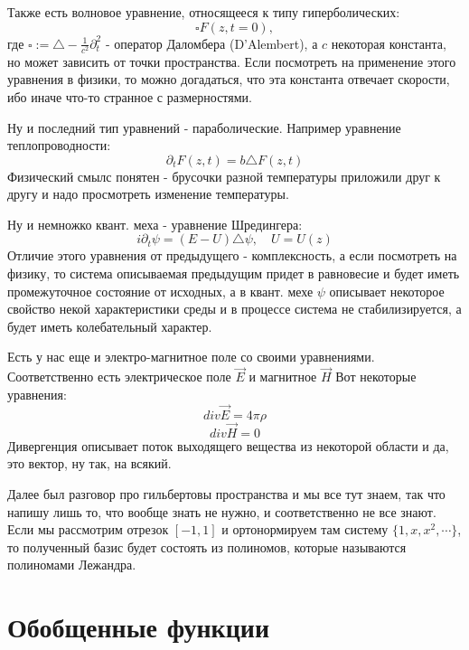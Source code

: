 \documentclass[12pt,a4paper]{article} %
\begin{document}
	Также есть волновое уравнение, относящееся к типу гиперболических:
	$$\square F(z,t=0),$$
	где $\square:=\triangle-\frac{1}{c^2}\partial_t^2$ - оператор Даломбера (D'Alembert), а $c$ некоторая константа, но может зависить от точки пространства. Если посмотреть на применение этого уравнения в физики, то можно догадаться, что эта константа отвечает скорости, ибо иначе что-то странное с размерностями.
	
	Ну и последний тип уравнений - параболические. Например уравнение теплопроводности:
	$$\partial_t F(z,t)=b\triangle F(z,t)$$
	Физический смылс понятен - брусочки разной температуры приложили друг к другу и надо просмотреть изменение температуры.
	
	Ну и немножко квант. меха - уравнение Шредингера:
	$$i\partial_t\psi=(E-U)\triangle\psi,\quad U=U(z)$$
	Отличие этого уравнения от предыдущего - комплексность, а если посмотреть на физику, то система описываемая предыдущим придет в равновесие и будет иметь промежуточное состояние от исходных, а в квант. мехе $\psi$ описывает некоторое свойство некой характеристики среды и в процессе система не стабилизируется, а будет иметь колебательный характер.
	
	Есть у нас еще и электро-магнитное поле со своими уравнениями. Соответственно есть электрическое поле $\overrightarrow{E}$ и магнитное $\overrightarrow{H}$ Вот некоторые уравнения:
	$$div\overrightarrow{E}=4\pi\rho$$
	$$div\overrightarrow{H}=0$$
	Дивергенция описывает поток выходящего вещества из некоторой области и да, это вектор, ну так, на всякий.
	
	Далее был разговор про гильбертовы пространства и мы все тут знаем, так что напишу лишь то, что вообще знать не нужно, и соответственно не все знают. Если мы рассмотрим отрезок $[-1,1]$ и ортонормируем там систему $\{1,x,x^2,\cdots\}$, то полученный базис будет состоять из полиномов, которые называются полиномами Лежандра.
	\section{Обобщенные функции}
\end{document}
